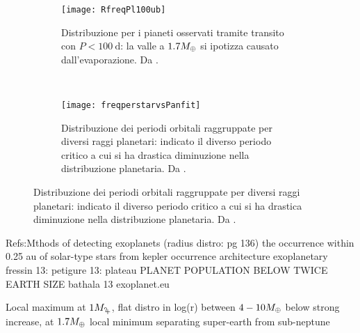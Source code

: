 

\begin{figure}[!ht]
\begin{subfigure}[b]{0.49\textwidth} \centering \texttt{[image: RfreqPl100ub]} 
\caption{Distribuzione per i pianeti osservati tramite transito con $P<\SI{100}{\day}$: la valle a $1.7M_{\oplus}{}$ si ipotizza causato dall'evaporazione. Da \cite{fulton2017california}.}\label{fig:RfreqPl100ub}\end{subfigure}
~
\begin{subfigure}[b]{0.47\textwidth}
\centering
\texttt{[image: freqperstarvsPanfit]}
\caption{Distribuzione dei periodi orbitali raggruppate per diversi raggi planetari: indicato il diverso periodo critico a cui si ha drastica diminuzione nella distribuzione planetaria. Da \cite{howard2012planet}.}\label{fig:freqperstarvsPanfit}
\end{subfigure}
\end{figure}

\begin{workout}
Refs:Mthods of detecting exoplanets (radius distro: pg 136)
the occurrence within 0.25 au of solar-type stars from kepler
occurrence architecture exoplanetary
fressin 13: 
petigure 13: plateau PLANET POPULATION BELOW TWICE EARTH SIZE
bathala 13
exoplanet.eu
\end{workout}

\begin{workout}
Local maximum at $1\mjupiter{}$, flat distro in log(r) between $4-10M_{\oplus}{}$ below strong increase, at $1.7M_{\oplus}{}$ local minimum separating super-earth from sub-neptune
\end{workout}

